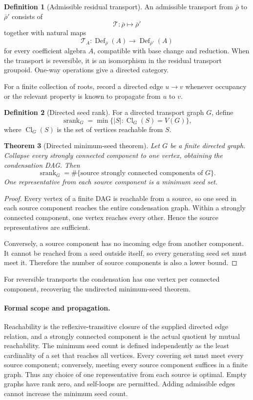 \documentclass[11pt]{article}
\newtheorem{theorem}{Theorem}[section]
\theoremstyle{definition}
\newtheorem{definition}[theorem]{Definition}
\theoremstyle{remark}
\newcommand{\Def}{\operatorname{Def}}
\newcommand{\srank}{\operatorname{srank}}
\newcommand{\Cl}{\operatorname{Cl}}
\begin{document}
\begin{definition}[Admissible residual transport]\label{px:7.1}
An admissible transport from \(\bar\rho\) to \(\bar\rho'\) consists of
\[
\mathcal T:\bar\rho\longmapsto\bar\rho'
\]
together with natural maps
\[
\mathcal T_A:\Def_{\bar\rho}(A)\longrightarrow\Def_{\bar\rho'}(A)
\]
for every coefficient algebra \(A\), compatible with base change and reduction.  When the transport is reversible, it is an isomorphism in the residual transport groupoid.  One-way operations give a directed category.
\end{definition}

For a finite collection of roots, record a directed edge \(u\to v\) whenever occupancy or the relevant property is known to propagate from \(u\) to \(v\).

\begin{definition}[Directed seed rank]\label{px:7.2}
For a directed transport graph \(G\), define
\[
\srank_G
=
\min\{|S|:\Cl_G(S)=V(G)\},
\]
where \(\Cl_G(S)\) is the set of vertices reachable from \(S\).
\end{definition}

\begin{theorem}[Directed minimum-seed theorem]\label{px:7.3}
Let \(G\) be a finite directed graph.  Collapse every strongly connected component to one vertex, obtaining the condensation DAG.  Then
\[
\boxed{
\srank_G
=
\#\{\text{source strongly connected components of }G\}.
}
\]
One representative from each source component is a minimum seed set.
\end{theorem}

\begin{proof}
Every vertex of a finite DAG is reachable from a source, so one seed in each source component reaches the entire condensation graph.  Within a strongly connected component, one vertex reaches every other.  Hence the source representatives are sufficient.

Conversely, a source component has no incoming edge from another component.  It cannot be reached from a seed outside itself, so every generating seed set must meet it.  Therefore the number of source components is also a lower bound.
\end{proof}

For reversible transports the condensation has one vertex per connected component, recovering the undirected minimum-seed theorem.

\paragraph{Formal scope and propagation.}
Reachability is the reflexive-transitive closure of the supplied directed edge
relation, and a strongly connected component is the actual quotient by mutual
reachability. The minimum seed count is defined independently as the least
cardinality of a set that reaches all vertices. Every covering set must meet
every source component; conversely, meeting every source component suffices
in a finite graph. Thus any choice of one representative from each source is
optimal. Empty graphs have rank zero, and self-loops are permitted. Adding
admissible edges cannot increase the minimum seed count.
\end{document}
